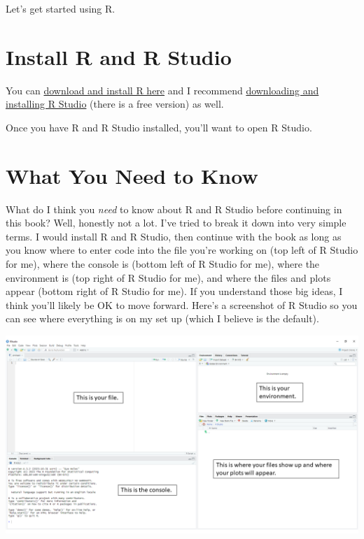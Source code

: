 \documentclass[
]{book}
\begin{document}
Let's get started using R.

\hypertarget{install-r-and-r-studio}{%
\section{Install R and R Studio}\label{install-r-and-r-studio}}

You can \href{https://www.r-project.org/}{download and install R here} and I recommend \href{https://posit.co/download/rstudio-desktop/}{downloading and installing R Studio} (there is a free version) as well.

Once you have R and R Studio installed, you'll want to open R Studio.

\hypertarget{what-you-need-to-know}{%
\section{What You Need to Know}\label{what-you-need-to-know}}

What do I think you \emph{need} to know about R and R Studio before continuing in this book? Well, honestly not a lot. I've tried to break it down into very simple terms. I would install R and R Studio, then continue with the book as long as you know where to enter code into the file you're working on (top left of R Studio for me), where the console is (bottom left of R Studio for me), where the environment is (top right of R Studio for me), and where the files and plots appear (bottom right of R Studio for me). If you understand those big ideas, I think you'll likely be OK to move forward. Here's a screenshot of R Studio so you can see where everything is on my set up (which I believe is the default).

\includegraphics[width=1\textwidth,height=\textheight]{images/Rstudio.png}
\end{document}
